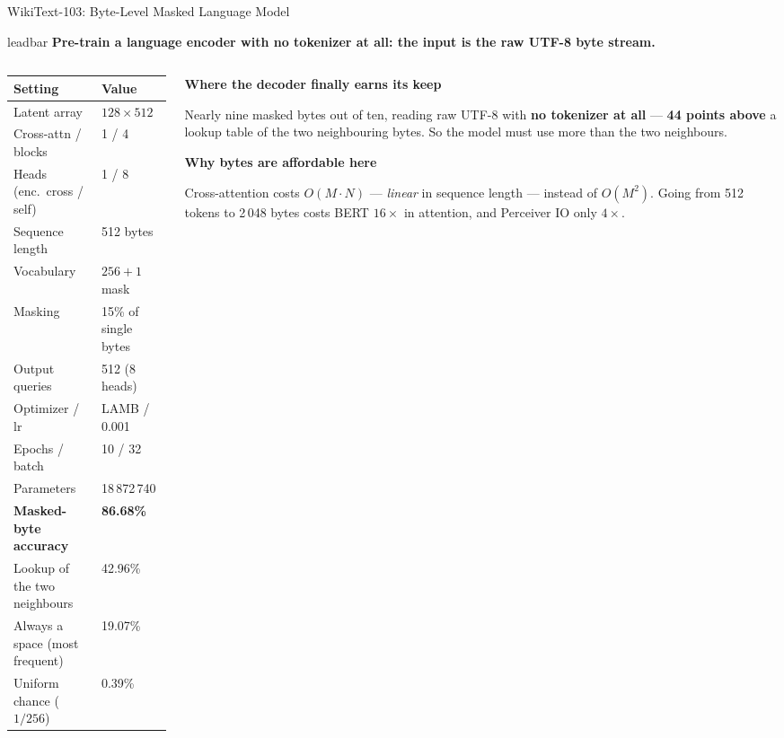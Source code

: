 \documentclass[aspectratio=169,11pt]{beamer}
\newcommand{\lead}[1]{%
  \begin{beamercolorbox}[wd=\textwidth,sep=5pt,center]{leadbar}%
    \small\bfseries #1%
  \end{beamercolorbox}\vspace{0.6em}}
\newcommand{\colhead}[1]{{\color{HeadBlue}\bfseries #1}\par\vspace{0.25em}}
\begin{document}
\begin{frame}[shrink=18]{WikiText-103: Byte-Level Masked Language Model}
  \lead{Pre-train a language encoder with no tokenizer at all: the input is the raw UTF-8 byte stream.}
  \begin{columns}[T]
    \begin{column}{0.46\textwidth}
      \begin{table}
        \centering\small
        \begin{tabular}{ll}
          \toprule
          \textbf{Setting} & \textbf{Value} \\
          \midrule
          Latent array & $128 \times 512$ \\
          Cross-attn / blocks & 1 / 4 \\
          Heads (enc.\ cross / self) & 1 / 8 \\
          Sequence length & 512 bytes \\
          Vocabulary & $256 + 1$ mask \\
          Masking & 15\% of single bytes \\
          Output queries & 512 (8 heads) \\
          Optimizer / lr & LAMB / 0.001 \\
          Epochs / batch & 10 / 32 \\
          Parameters & 18\,872\,740 \\
          \midrule
          \textbf{Masked-byte accuracy} & \textbf{86.68\%} \\
          Lookup of the two neighbours & 42.96\% \\
          Always a space (most frequent) & 19.07\% \\
          Uniform chance ($1/256$) & 0.39\% \\
          \bottomrule
        \end{tabular}
      \end{table}
    \end{column}
    \begin{column}{0.50\textwidth}
      \colhead{Where the decoder finally earns its keep}
        \small
        Nearly nine masked bytes out of ten, reading raw UTF-8 with \textbf{no tokenizer at all} --- \textbf{44 points above} a lookup table of the two neighbouring bytes. So the model must use more than the two neighbours.
      

      \vspace{0.3em}
      \colhead{Why bytes are affordable here}
        \small
        Cross-attention costs $O(M \cdot N)$ --- \emph{linear} in sequence length --- instead of $O(M^2)$. Going from 512 tokens to 2\,048 bytes costs BERT $16\times$ in attention, and Perceiver IO only $4\times$.
      


\end{column}
\end{columns}
\end{frame}
\end{document}
